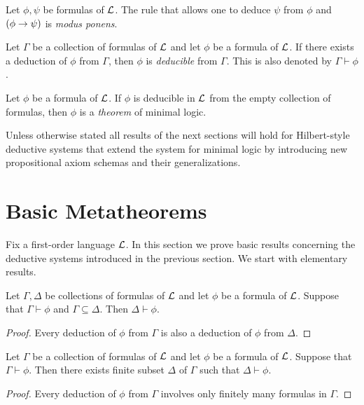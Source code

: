 \documentclass[10pt]{amsart}
\begin{document}
\begin{remark}\label{remark:modus_ponens}
  Let $\phi, \psi$ be formulas of ${\mathcal L}$. The rule that allows one to deduce $\psi$ from $\phi$ and $(\phi \rightarrow \psi)$ is \textit{modus ponens}.
\end{remark}

\begin{definition}
	Let $\Gamma$ be a collection of formulas of ${\mathcal L}$ and let $\phi$ be a formula of ${\mathcal L}$. If there exists a deduction of $\phi$ from $\Gamma$, then $\phi$ is \textit{deducible} from $\Gamma$. This is also denoted by $\Gamma \vdash \phi$.
\end{definition}

\begin{definition}
	Let $\phi$ be a formula of ${\mathcal L}$. If $\phi$ is deducible in ${\mathcal L}$ from the empty collection of formulas, then $\phi$ is a \textit{theorem} of minimal logic.
\end{definition}

\begin{remark}\label{remark:scope_of_system}
  Unless otherwise stated all results of the next sections will hold for Hilbert-style deductive systems that extend the system for minimal logic by introducing new propositional axiom schemas and their generalizations.
\end{remark}

\section{Basic Metatheorems}
\noindent
Fix a first-order language ${\mathcal L}$. In this section we prove basic results concerning the deductive systems introduced in the previous section. We start with elementary results.

\begin{proposition}\label{proposition:monotonicity_of_deductive_system}
	Let $\Gamma, \Delta$ be collections of formulas of ${\mathcal L}$ and let $\phi$ be a formula of ${\mathcal L}$. Suppose that $\Gamma \vdash \phi$ and $\Gamma \subseteq \Delta$. Then $\Delta \vdash \phi$.
\end{proposition}
\begin{proof}
	Every deduction of $\phi$ from $\Gamma$ is also a deduction of $\phi$ from $\Delta$.
\end{proof}

\begin{proposition}\label{proposition:compactness_of_deductive_system}
	Let $\Gamma$ be a collection of formulas of ${\mathcal L}$ and let $\phi$ be a formula of ${\mathcal L}$. Suppose that $\Gamma \vdash \phi$. Then there exists finite subset $\Delta$ of $\Gamma$ such that $\Delta \vdash \phi$.
\end{proposition}
\begin{proof}
	Every deduction of $\phi$ from $\Gamma$ involves only finitely many formulas in $\Gamma$.
\end{proof}
\end{document}
